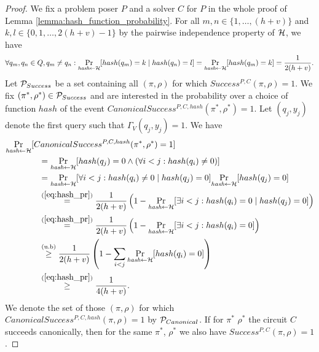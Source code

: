 \begin{proof}
We fix a problem poser $P$ and a solver $C$ for $P$ in the whole proof of Lemma \ref{lemma:hash_function_probability}.
For all $m,n \in \{1, \dots, (h+v)\}$ and $k,l \in \{0,1,\dots,2(h+v)-1\}$ by the pairwise independence property of $\mathcal{H}$, we have
\begin{align}
  \label{eq:hash_pr}
 \forall q_m,q_n \in Q, q_m \neq q_n : \underset{\textit{hash} \leftarrow \mathcal{H}}{\Pr}[hash(q_m) = k \mid hash(q_n) = l] =
 \underset{\textit{hash} \leftarrow \mathcal{H}}{\Pr}[hash(q_m) = k] = \frac{1}{2(h+v)}.
\end{align}
%
Let $\mathcal{P}_{Success}$ be a set containing all $(\pi,\rho)$ for which $Success^{P, C}(\pi, \rho) = 1$.
We fix $(\pi^*, \rho^*) \in \mathcal{P}_{Success}$ and are interested in the probability over
a choice of function $hash$ of the event $CanonicalSuccess^{P,C,hash}(\pi^*, \rho^*) = 1$.
Let $(q_j, y_j)$ denote the first query such that $\Gamma_V(q_j, y_j) = 1$.
We have
\begin{align}
  \label{ineq:prob_hash_success}
  &\underset{\textit{hash} \leftarrow \mathcal{H}}{\Pr}[CanonicalSuccess^{P,C,hash}(\pi^*, \rho^*) = 1] \notag\\
  &\mbox\qquad\qquad = \underset{\textit{hash} \leftarrow \mathcal{H}}{\Pr}[hash(q_j) = 0 \land (\forall i < j : hash(q_i) \neq 0)] \notag\\
  &\mbox\qquad\qquad = \underset{\textit{hash} \leftarrow \mathcal{H}}{\Pr}[\forall i < j : hash(q_i) \neq 0 \mid hash(q_j) = 0] \underset{\textit{hash} \leftarrow \mathcal{H}}{\Pr}[hash(q_j) = 0] \notag\\
  &\mbox\qquad\qquad \stackrel{(\ref{eq:hash_pr})}{=} \frac{1}{2(h+v)}\left(1 -\underset{\textit{hash} \leftarrow \mathcal{H}}{\Pr}[\exists i < j : hash(q_i) = 0 \mid hash(q_j) = 0] \right) \notag\\
  &\mbox\qquad\qquad \stackrel{(\ref{eq:hash_pr})}{=} \frac{1}{2(h+v)} \left( 1 -\underset{\textit{hash} \leftarrow \mathcal{H}}{\Pr}[\exists i < j : hash(q_i) = 0] \right) \notag\\
  &\mbox\qquad\qquad \stackrel{(\text{u.b})}{\geq} \frac{1}{2(h+v)} \left( 1 - \sum_{i < j} \underset{\textit{hash} \leftarrow \mathcal{H}}{\Pr}[hash(q_i) = 0] \right) \notag\\
  &\mbox\qquad\qquad \stackrel{(\ref{eq:hash_pr})}{\geq} \frac{1}{4(h+v)}.
\end{align}
%
We denote the set of those $(\pi,\rho)$ for which $CanonicalSuccess^{P, C, hash}(\pi, \rho) = 1$ by $\mathcal{P}_{Canonical}$.
If for $\pi^*$ $\rho^*$ the circuit $C$ succeeds canonically, then for the same $\pi^*$, $\rho^*$ we also have $Success^{P, C}(\pi, \rho) = 1$.

\end{proof}
